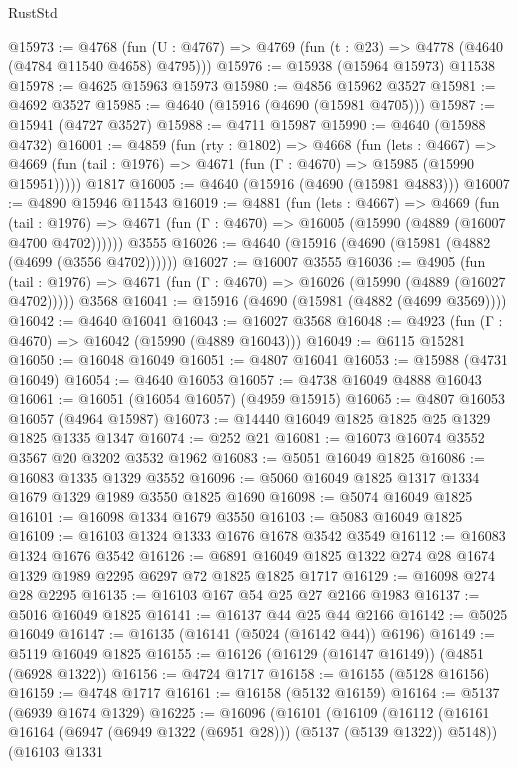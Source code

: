 \begin{lexlean}{RustStd}
\begin{coremodule}
@15973 := @4768
    (fun (U : @4767) => @4769 (fun (t : @23) => @4778 (@4640 (@4784 @11540 @4658) @4795)))
@15976 := @15938 (@15964 @15973) @11538
@15978 := @4625 @15963 @15973
@15980 := @4856 @15962 @3527
@15981 := @4692 @3527
@15985 := @4640 (@15916 (@4690 (@15981 @4705)))
@15987 := @15941 (@4727 @3527)
@15988 := @4711 @15987
@15990 := @4640 (@15988 @4732)
@16001 := @4859
    (fun (rty : @1802) =>
    @4668
      (fun (lets : @4667) =>
      @4669 (fun (tail : @1976) => @4671 (fun (Γ : @4670) => @15985 (@15990 @15951)))))
    @1817
@16005 := @4640 (@15916 (@4690 (@15981 @4883)))
@16007 := @4890 @15946 @11543
@16019 := @4881
    (fun (lets : @4667) =>
    @4669
      (fun (tail : @1976) =>
      @4671 (fun (Γ : @4670) => @16005 (@15990 (@4889 (@16007 @4700 @4702))))))
    @3555
@16026 := @4640 (@15916 (@4690 (@15981 (@4882 (@4699 (@3556 @4702))))))
@16027 := @16007 @3555
@16036 := @4905
    (fun (tail : @1976) => @4671 (fun (Γ : @4670) => @16026 (@15990 (@4889 (@16027 @4702)))))
    @3568
@16041 := @15916 (@4690 (@15981 (@4882 (@4699 @3569))))
@16042 := @4640 @16041
@16043 := @16027 @3568
@16048 := @4923 (fun (Γ : @4670) => @16042 (@15990 (@4889 @16043)))
@16049 := @6115 @15281
@16050 := @16048 @16049
@16051 := @4807 @16041
@16053 := @15988 (@4731 @16049)
@16054 := @4640 @16053
@16057 := @4738 @16049 @4888 @16043
@16061 := @16051 (@16054 @16057) (@4959 @15915)
@16065 := @4807 @16053 @16057 (@4964 @15987)
@16073 := @14440 @16049 @1825 @1825 @25 @1329 @1825 @1335 @1347
@16074 := @252 @21
@16081 := @16073 @16074 @3552 @3567 @20 @3202 @3532 @1962
@16083 := @5051 @16049 @1825
@16086 := @16083 @1335 @1329 @3552
@16096 := @5060 @16049 @1825 @1317 @1334 @1679 @1329 @1989 @3550 @1825 @1690
@16098 := @5074 @16049 @1825
@16101 := @16098 @1334 @1679 @3550
@16103 := @5083 @16049 @1825
@16109 := @16103 @1324 @1333 @1676 @1678 @3542 @3549
@16112 := @16083 @1324 @1676 @3542
@16126 := @6891 @16049 @1825 @1322 @274 @28 @1674 @1329 @1989 @2295 @6297 @72 @1825 @1825 @1717
@16129 := @16098 @274 @28 @2295
@16135 := @16103 @167 @54 @25 @27 @2166 @1983
@16137 := @5016 @16049 @1825
@16141 := @16137 @44 @25 @44 @2166
@16142 := @5025 @16049
@16147 := @16135 (@16141 (@5024 (@16142 @44)) @6196)
@16149 := @5119 @16049 @1825
@16155 := @16126 (@16129 (@16147 @16149)) (@4851 (@6928 @1322))
@16156 := @4724 @1717
@16158 := @16155 (@5128 @16156)
@16159 := @4748 @1717
@16161 := @16158 (@5132 @16159)
@16164 := @5137 (@6939 @1674 @1329)
@16225 := @16096
    (@16101
      (@16109
        (@16112 (@16161 @16164 (@6947 (@6949 @1322 (@6951 @28))) (@5137 (@5139 @1322)) @5148))
        (@16103
          @1331

\end{coremodule}
\end{lexlean}
